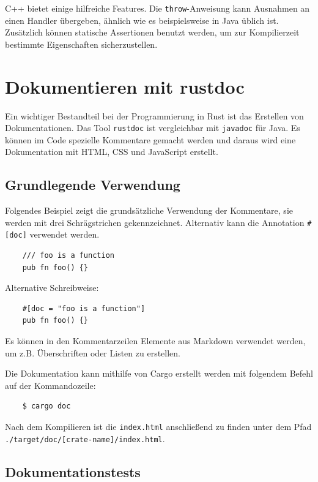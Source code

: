 C++ bietet einige hilfreiche Features. Die \verb"throw"-Anweisung kann Ausnahmen an einen Handler übergeben, ähnlich wie es beispielsweise in Java üblich ist. Zusätzlich können statische Assertionen benutzt werden, um zur Kompilierzeit bestimmte Eigenschaften sicherzustellen.


\section{Dokumentieren mit rustdoc}

Ein wichtiger Bestandteil bei der Programmierung in Rust ist das Erstellen von Dokumentationen. Das Tool \verb"rustdoc" ist vergleichbar mit \verb"javadoc" für Java. Es können im Code spezielle Kommentare gemacht werden und daraus wird eine Dokumentation mit HTML, CSS und JavaScript erstellt.

\subsection{Grundlegende Verwendung}

Folgendes Beispiel zeigt die grundsätzliche Verwendung der Kommentare, sie werden mit drei Schrägstrichen gekennzeichnet. Alternativ kann die Annotation \verb"#[doc]" verwendet werden.

\begin{lstlisting}
    /// foo is a function
    pub fn foo() {}
\end{lstlisting}

Alternative Schreibweise:

\begin{lstlisting}
    #[doc = "foo is a function"]
    pub fn foo() {}
\end{lstlisting}

Es können in den Kommentarzeilen Elemente aus Markdown verwendet werden, um z.B. Überschriften oder Listen zu erstellen.

Die Dokumentation kann mithilfe von Cargo erstellt werden mit folgendem Befehl auf der Kommandozeile:

\begin{lstlisting}
    $ cargo doc
\end{lstlisting}

Nach dem Kompilieren ist die \verb"index.html" anschließend zu finden unter dem Pfad \texttt{./target/doc/[crate-name]/index.html}.

\subsection{Dokumentationstests}

